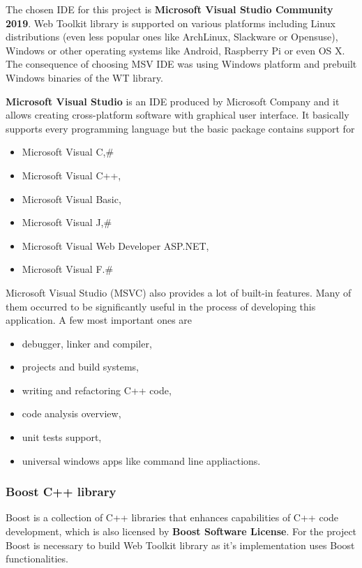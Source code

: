 \documentclass[a4paper,12pt]{book}
\makeatletter
\newcommand{\ttvar}{\begingroup\@makeother\#\@ttvar}
\newcommand{\@ttvar}[1]{\ttfamily\detokenize{#1}\endgroup}
\newcommand\tab[1][1cm]{\hspace*{#1}}
\makeatother
\begin{document}
{{\bigskip
The chosen IDE for this project is \textbf{Microsoft Visual Studio Community 2019}. Web Toolkit library is supported on various platforms including Linux distributions (even less popular ones like ArchLinux, Slackware or Opensuse), Windows or other operating systems like Android, Raspberry Pi or even OS X. The consequence of choosing MSV IDE was using Windows platform and prebuilt Windows binaries of the WT library.

\bigskip
\textbf{Microsoft Visual Studio} is an IDE produced by Microsoft Company and it allows creating cross-platform software with graphical user interface. It basically supports every programming language but the basic package contains support for 
\begin{itemize}
	\item Microsoft Visual C,\ttvar{#}
	\item Microsoft Visual C++,
	\item Microsoft Visual Basic,
	\item Microsoft Visual J,\ttvar{#}
	\item Microsoft Visual Web Developer ASP.NET,
	\item Microsoft Visual F.\ttvar{#}
\end{itemize}

Microsoft Visual Studio (MSVC) also provides a lot of built-in features. Many of them occurred to be significantly useful in the process of developing this application. A few most important ones are
\begin{itemize}
	\item debugger, linker and compiler,
	\item projects and build systems,
	\item writing and refactoring C++ code,
	\item code analysis overview,
	\item unit tests support,
	\item universal windows apps like command line appliactions.
\end{itemize}

}

\subsubsection*{Boost C++ library}
{
\tab Boost is a collection of C++ libraries that enhances capabilities of C++ code development, which is also licensed by \textbf{Boost Software License}. For the project Boost is necessary to build Web Toolkit library as it's implementation uses Boost functionalities.

}}
\end{document}
